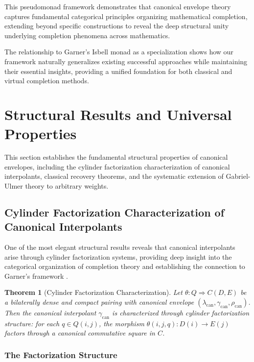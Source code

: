 \documentclass[11pt]{article}
\theoremstyle{plain}
\newtheorem{theorem}{Theorem}[section]
\theoremstyle{definition}
\theoremstyle{remark}
\begin{document}
This pseudomonad framework demonstrates that canonical envelope theory captures fundamental categorical principles organizing mathematical completion, extending beyond specific constructions to reveal the deep structural unity underlying completion phenomena across mathematics.

The relationship to Garner's Isbell monad as a specialization shows how our framework naturally generalizes existing successful approaches while maintaining their essential insights, providing a unified foundation for both classical and virtual completion methods.

\section{Structural Results and Universal Properties}

This section establishes the fundamental structural properties of canonical envelopes, including the cylinder factorization characterization of canonical interpolants, classical recovery theorems, and the systematic extension of Gabriel-Ulmer theory to arbitrary weights.

\subsection{Cylinder Factorization Characterization of Canonical Interpolants}

One of the most elegant structural results reveals that canonical interpolants arise through cylinder factorization systems, providing deep insight into the categorical organization of completion theory and establishing the connection to Garner's framework \cite{garner2018cylinder}.

\begin{theorem}[Cylinder Factorization Characterization]
Let $\theta : Q \Rightarrow C(D, E)$ be a bilaterally dense and compact pairing with canonical envelope $(\lambda_{\mathrm{can}}, \gamma_{\mathrm{can}}, \rho_{\mathrm{can}})$. Then the canonical interpolant $\gamma_{\mathrm{can}}$ is characterized through cylinder factorization structure: for each $q \in Q(i,j)$, the morphism $\theta(i,j,q) : D(i) \to E(j)$ factors through a canonical commutative square in $C$.
\end{theorem}

\subsubsection{The Factorization Structure}
\end{document}
